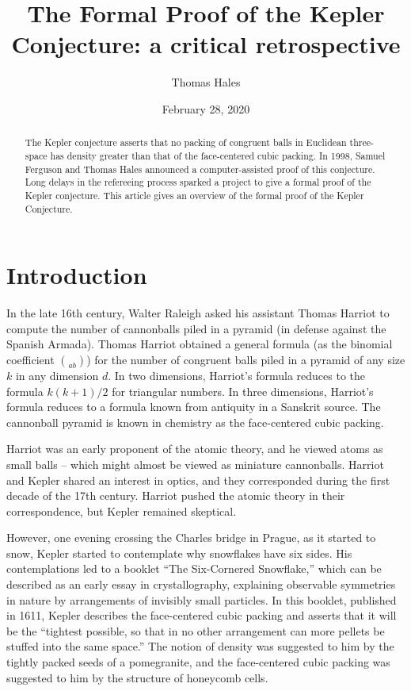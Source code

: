 \documentclass{amsart}
\title{The Formal Proof of the Kepler Conjecture: a critical retrospective}
\author{Thomas Hales}
\date{}
\date{February 28, 2020}
\begin{document}
\maketitle

\begin{abstract} 
  The Kepler conjecture asserts that no packing of congruent balls in
  Euclidean three-space has density greater than that of the
  face-centered cubic packing.  In 1998, Samuel Ferguson and Thomas
  Hales announced a computer-assisted proof of this conjecture.  Long
  delays in the refereeing process sparked a project to give a formal
  proof of the Kepler conjecture.  This article gives an overview of
  the formal proof of the Kepler Conjecture.
\end{abstract}

\baselineskip
{}\baselineskip

\newenvironment{blockquote}{%
  \par%
  \medskip%
  \baselineskip=0.7\baselineskip%
  \leftskip=2em\rightskip=2em%
  \noindent\ignorespaces}{%
  \par\medskip}

\section{Introduction}

In the late 16th century, Walter Raleigh asked his assistant Thomas
Harriot to compute the number of cannonballs piled in a pyramid (in
defense against the Spanish Armada).  Thomas Harriot obtained a
general formula (as the binomial coefficient $\choose{a}{b}$) for the
number of congruent balls piled in a pyramid of any size $k$ in any
dimension $d$.  In two dimensions, Harriot's formula reduces to the
formula $k(k+1)/2$ for triangular numbers.  In three dimensions,
Harriot's formula reduces to a formula known from antiquity in a
Sanskrit source.  The cannonball pyramid is known in chemistry as the
face-centered cubic packing.

Harriot was an early proponent of the atomic theory, and he viewed
atoms as small balls -- which might almost be viewed as miniature
cannonballs.  Harriot and Kepler shared an interest in optics, and
they corresponded during the first decade of the 17th century.
Harriot pushed the atomic theory in their correspondence, but Kepler
remained skeptical.

However, one evening crossing the Charles bridge in Prague, as it
started to snow, Kepler started to contemplate why snowflakes have six
sides.  His contemplations led to a booklet ``The Six-Cornered
Snowflake,'' which can be described as an early essay in
crystallography, explaining observable symmetries in nature by
arrangements of invisibly small particles.  In this booklet, published
in 1611, Kepler describes the face-centered cubic packing and asserts
that it will be the ``tightest possible, so that in no other
arrangement can more pellets be stuffed into the same space.'' The
notion of density was suggested to him by the tightly packed seeds of
a pomegranite, and the face-centered cubic packing was suggested to
him by the structure of honeycomb cells.
\end{document}
